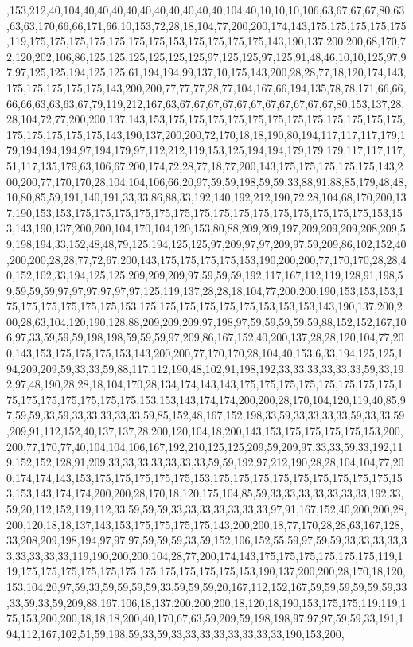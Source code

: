 ,153,212,40,104,40,40,40,40,40,40,40,40,40,40,104,40,10,10,10,106,63,67,67,67,80,63,63,63,170,66,66,171,66,10,153,72,28,18,104,77,200,200,174,143,175,175,175,175,175,119,175,175,175,175,175,175,175,153,175,175,175,175,143,190,137,200,200,68,170,72,120,202,106,86,125,125,125,125,125,125,97,125,125,97,125,91,48,46,10,10,125,97,97,97,125,125,194,125,125,61,194,194,99,137,10,175,143,200,28,28,77,18,120,174,143,175,175,175,175,175,143,200,200,77,77,77,28,77,104,167,66,194,135,78,78,171,66,66,66,66,63,63,63,67,79,119,212,167,63,67,67,67,67,67,67,67,67,67,67,67,80,153,137,28,28,104,72,77,200,200,137,143,153,175,175,175,175,175,175,175,175,175,175,175,175,175,175,175,175,175,143,190,137,200,200,72,170,18,18,190,80,194,117,117,117,179,179,194,194,194,97,194,179,97,112,212,119,153,125,194,194,179,179,179,117,117,117,51,117,135,179,63,106,67,200,174,72,28,77,18,77,200,143,175,175,175,175,175,143,200,200,77,170,170,28,104,104,106,66,20,97,59,59,198,59,59,33,88,91,88,85,179,48,48,10,80,85,59,191,140,191,33,33,86,88,33,192,140,192,212,190,72,28,104,68,170,200,137,190,153,153,175,175,175,175,175,175,175,175,175,175,175,175,175,175,175,153,153,143,190,137,200,200,104,170,104,120,153,80,88,209,209,197,209,209,209,208,209,59,198,194,33,152,48,48,79,125,194,125,125,97,209,97,97,209,97,59,209,86,102,152,40,200,200,28,28,77,72,67,200,143,175,175,175,175,153,190,200,200,77,170,170,28,28,40,152,102,33,194,125,125,209,209,209,97,59,59,59,192,117,167,112,119,128,91,198,59,59,59,59,97,97,97,97,97,97,125,119,137,28,28,18,104,77,200,200,190,153,153,153,175,175,175,175,175,175,153,175,175,175,175,175,175,153,153,153,143,190,137,200,200,28,63,104,120,190,128,88,209,209,209,97,198,97,59,59,59,59,59,88,152,152,167,106,97,33,59,59,59,198,198,59,59,59,97,209,86,167,152,40,200,137,28,28,120,104,77,200,143,153,175,175,175,153,143,200,200,77,170,170,28,104,40,153,6,33,194,125,125,194,209,209,59,33,33,59,88,117,112,190,48,102,91,198,192,33,33,33,33,33,33,59,33,192,97,48,190,28,28,18,104,170,28,134,174,143,143,175,175,175,175,175,175,175,175,175,175,175,175,175,175,175,153,153,143,174,174,200,200,28,170,104,120,119,40,85,97,59,59,33,59,33,33,33,33,33,59,85,152,48,167,152,198,33,59,33,33,33,33,59,33,33,59,209,91,112,152,40,137,137,28,200,120,104,18,200,143,153,175,175,175,175,153,200,200,77,170,77,40,104,104,106,167,192,210,125,125,209,59,209,97,33,33,59,33,192,119,152,152,128,91,209,33,33,33,33,33,33,33,59,59,192,97,212,190,28,28,104,104,77,200,174,174,143,153,175,175,175,175,175,153,175,175,175,175,175,175,175,175,175,153,153,143,174,174,200,200,28,170,18,120,175,104,85,59,33,33,33,33,33,33,33,192,33,59,20,112,152,119,112,33,59,59,59,33,33,33,33,33,33,33,97,91,167,152,40,200,200,28,200,120,18,18,137,143,153,175,175,175,175,143,200,200,18,77,170,28,28,63,167,128,33,208,209,198,194,97,97,97,59,59,59,33,59,152,106,152,55,59,97,59,59,33,33,33,33,33,33,33,33,33,119,190,200,200,104,28,77,200,174,143,175,175,175,175,175,175,119,119,175,175,175,175,175,175,175,175,175,175,175,153,190,137,200,200,28,170,18,120,153,104,20,97,59,33,59,59,59,59,33,59,59,59,20,167,112,152,167,59,59,59,59,59,59,33,33,59,33,59,209,88,167,106,18,137,200,200,200,18,120,18,190,153,175,175,119,119,175,153,200,200,18,18,18,200,40,170,67,63,59,209,59,198,198,97,97,97,59,59,33,191,194,112,167,102,51,59,198,59,33,59,33,33,33,33,33,33,33,33,190,153,200,